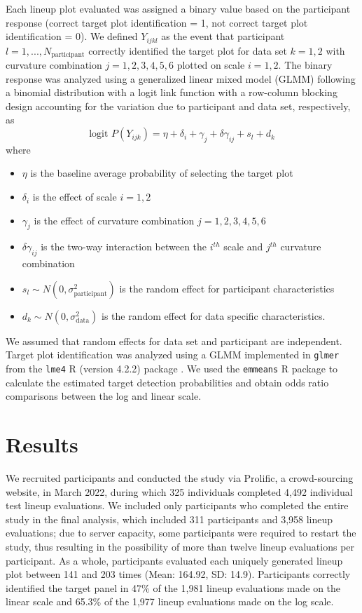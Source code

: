 \documentclass[12pt]{article}
\begin{document}
Each lineup plot evaluated was assigned a binary value based on the
participant response (correct target plot identification = 1, not
correct target plot identification = 0). We defined \(Y_{ijkl}\) as the
event that participant \(l = 1,...,N_\text{participant}\) correctly
identified the target plot for data set \(k = 1,2\) with curvature
combination \(j = 1,2,3,4,5,6\) plotted on scale \(i = 1,2\). The binary
response was analyzed using a generalized linear mixed model (GLMM)
following a binomial distribution with a logit link function with a
row-column blocking design accounting for the variation due to
participant and data set, respectively, as \begin{equation}
\text{logit }P(Y_{ijk}) = \eta + \delta_i + \gamma_j + \delta \gamma_{ij} + s_l + d_k
\end{equation} \noindent where

\begin{itemize}
\item $\eta$ is the baseline average probability of selecting the target plot
\item $\delta_i$ is the effect of scale $i = 1,2$
\item $\gamma_j$ is the effect of curvature combination $j = 1,2,3,4,5,6$
\item $\delta\gamma_{ij}$ is the two-way interaction between the $i^{th}$ scale and $j^{th}$ curvature combination
\item $s_l \sim N(0,\sigma^2_\text{participant})$ is the random effect for participant characteristics
\item $d_k \sim N(0,\sigma^2_{\text{data}})$ is the random effect for data specific characteristics. 
\end{itemize}

\noindent We assumed that random effects for data set and participant
are independent. Target plot identification was analyzed using a GLMM
implemented in \texttt{glmer} from the \texttt{lme4} R (version 4.2.2)
package \citep{lme4}. We used the \texttt{emmeans} R package
\citep{emmeans} to calculate the estimated target detection
probabilities and obtain odds ratio comparisons between the log and
linear scale.

\hypertarget{results}{%
\section{Results}\label{results}}

We recruited participants and conducted the study via Prolific, a
crowd-sourcing website, in March 2022, during which 325 individuals
completed 4,492 individual test lineup evaluations. We included only
participants who completed the entire study in the final analysis, which
included 311 participants and 3,958 lineup evaluations; due to server
capacity, some participants were required to restart the study, thus
resulting in the possibility of more than twelve lineup evaluations per
participant. As a whole, participants evaluated each uniquely generated
lineup plot between 141 and 203 times (Mean: 164.92, SD: 14.9).
Participants correctly identified the target panel in 47\% of the 1,981
lineup evaluations made on the linear scale and 65.3\% of the 1,977
lineup evaluations made on the log scale.
\end{document}
